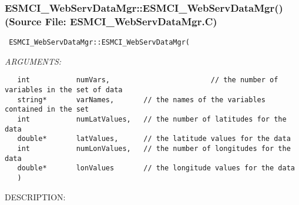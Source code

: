  
\setlength{\oldparskip}{\parskip}
\setlength{\parskip}{1.5ex}
\setlength{\oldparindent}{\parindent}
\setlength{\parindent}{0pt}
\setlength{\oldbaselineskip}{\baselineskip}
\setlength{\baselineskip}{11pt}
 
\def\bv{\begin{verbatim}}
\def\ev{\end{verbatim}}
\def\be{\begin{equation}}
\def\ee{\end{equation}}
\def\bea{\begin{eqnarray}}
\def\eea{\end{eqnarray}}
\def\bi{\begin{itemize}}
\def\ei{\end{itemize}}
\def\bn{\begin{enumerate}}
\def\en{\end{enumerate}}
\def\bd{\begin{description}}
\def\ed{\end{description}}
\def\({\left (}
\def\){\right )}
\def\[{\left [}
\def\]{\right ]}
\def\<{\left  \langle}
\def\>{\right \rangle}
\def\cI{{\cal I}}
\def\diag{\mathop{\rm diag}}
\def\tr{\mathop{\rm tr}}


 
\subsubsection{ESMCI\_WebServDataMgr::ESMCI\_WebServDataMgr() (Source File: ESMCI\_WebServDataMgr.C)}


  
\begin{verbatim} ESMCI_WebServDataMgr::ESMCI_WebServDataMgr(\end{verbatim}{\em ARGUMENTS:}
\begin{verbatim}   int           numVars,                        // the number of variables in the set of data
   string*       varNames,       // the names of the variables contained in the set
   int           numLatValues,   // the number of latitudes for the data
   double*       latValues,      // the latitude values for the data
   int           numLonValues,   // the number of longitudes for the data
   double*       lonValues       // the longitude values for the data
   )\end{verbatim}
{\sf DESCRIPTION:\\ }


